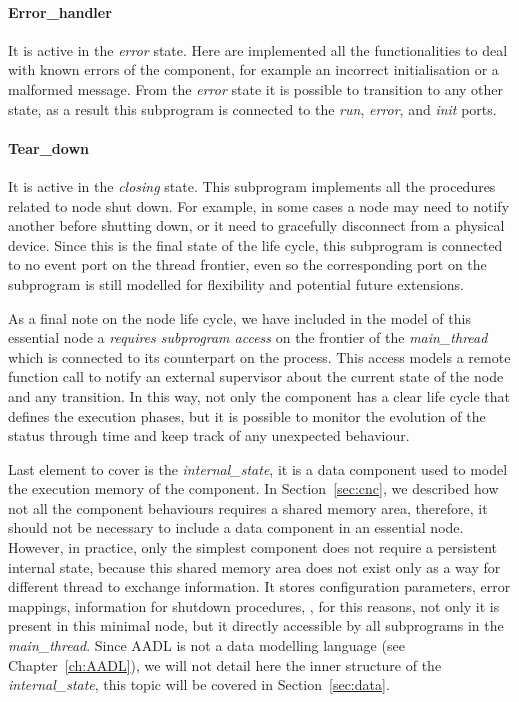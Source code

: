 \paragraph{Error\_handler} It is active in the \textit{error} state. Here are implemented all the functionalities to deal with known errors of the component, for example an incorrect initialisation or a malformed message. From the \textit{error} state it is possible to transition to any other state, as a result this subprogram is connected to the \textit{run}, \textit{error}, and \textit{init} ports.
\paragraph{Tear\_down} It is active in the \textit{closing} state. This subprogram implements all the procedures related to node shut down. For example, in some cases a node may need to notify another before shutting down, or it need to gracefully disconnect from a physical device. Since this is the final state of the life cycle, this subprogram is connected to no event port on the thread frontier, even so the corresponding port on the subprogram is still modelled for flexibility and potential future extensions.
\medskip

As a final note on the node life cycle, we have included in the model of this essential node a \textit{requires subprogram access} on the frontier of the \textit{main\_thread} which is connected to its counterpart on the process. This access models a remote function call to notify an external supervisor about the current state of the node and any transition. In this way, not only the component has a clear life cycle that defines the execution phases, but it is possible to monitor the evolution of the status through time and keep track of any unexpected behaviour.

Last element to cover is the \textit{internal\_state}, it is a data component used to model the execution memory of the component. In Section~\ref{sec:cnc}, we described how not all the component behaviours requires a shared memory area, therefore, it should not be necessary to include a data component in an essential node. However, in practice, only the simplest component does not require a persistent internal state, because this shared memory area does not exist only as a way for different thread to exchange information. It stores configuration parameters, error mappings, information for shutdown procedures, \etc, for this reasons, not only it is present in this minimal node, but it directly accessible by all subprograms in the \textit{main\_thread}. Since AADL is not a data modelling language (see Chapter~\ref{ch:AADL}), we will not detail here the inner structure of the \textit{internal\_state}, this topic will be covered in Section~\ref{sec:data}.

